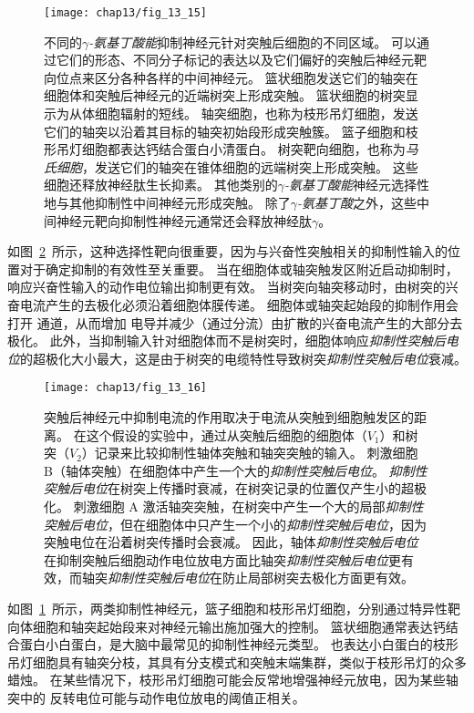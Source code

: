 \begin{figure}[htbp]
	\centering
	\texttt{[image: chap13/fig\_13\_15]}
	\caption{不同的\textit{$\gamma$-氨基丁酸能}抑制神经元针对突触后细胞的不同区域。
		可以通过它们的形态、不同分子标记的表达以及它们偏好的突触后神经元靶向位点来区分各种各样的中间神经元。
		篮状细胞发送它们的轴突在细胞体和突触后神经元的近端树突上形成突触。
		篮状细胞的树突显示为从体细胞辐射的短线。
		轴突细胞，也称为枝形吊灯细胞，发送它们的轴突以沿着其目标的轴突初始段形成突触簇。
		篮子细胞和枝形吊灯细胞都表达钙结合蛋白小清蛋白。
		树突靶向细胞，也称为\textit{马氏细胞}，发送它们的轴突在锥体细胞的远端树突上形成突触。
		这些细胞还释放神经肽生长抑素。
		其他类别的\textit{$\gamma$-氨基丁酸能}神经元选择性地与其他抑制性中间神经元形成突触。
		除了\textit{$\gamma$-氨基丁酸}之外，这些中间神经元靶向抑制性神经元通常还会释放神经肽$\gamma$。}
	\label{fig:13_15}
\end{figure}


如图~\ref{fig:13_16}~所示，这种选择性靶向很重要，因为与兴奋性突触相关的抑制性输入的位置对于确定抑制的有效性至关重要。
当在细胞体或轴突触发区附近启动抑制时，响应兴奋性输入的动作电位输出抑制更有效。
当树突向轴突移动时，由树突的兴奋电流产生的去极化必须沿着细胞体膜传递。
细胞体或轴突起始段的抑制作用会打开  通道，从而增加  电导并减少（通过分流）由扩散的兴奋电流产生的大部分去极化。
此外，当抑制输入针对细胞体而不是树突时，细胞体响应\textit{抑制性突触后电位}的超极化大小最大，这是由于树突的电缆特性导致树突\textit{抑制性突触后电位}衰减。


\begin{figure}[htbp]
	\centering
	\texttt{[image: chap13/fig\_13\_16]}
	\caption{突触后神经元中抑制电流的作用取决于电流从突触到细胞触发区的距离。
		在这个假设的实验中，通过从突触后细胞的细胞体（$ V_1 $）和树突（$ V_2 $）记录来比较抑制性轴体突触和轴突突触的输入。
		刺激细胞 B（轴体突触）在细胞体中产生一个大的\textit{抑制性突触后电位}。
		\textit{抑制性突触后电位}在树突上传播时衰减，在树突记录的位置仅产生小的超极化。
		刺激细胞 A 激活轴突突触，在树突中产生一个大的局部\textit{抑制性突触后电位}，但在细胞体中只产生一个小的\textit{抑制性突触后电位}，因为突触电位在沿着树突传播时会衰减。
		因此，轴体\textit{抑制性突触后电位}在抑制突触后细胞动作电位放电方面比轴突\textit{抑制性突触后电位}更有效，而轴突\textit{抑制性突触后电位}在防止局部树突去极化方面更有效。}
	\label{fig:13_16}
\end{figure}


如图~\ref{fig:13_15}~所示，两类抑制性神经元，篮子细胞和枝形吊灯细胞，分别通过特异性靶向体细胞和轴突起始段来对神经元输出施加强大的控制。
篮状细胞通常表达钙结合蛋白小白蛋白，是大脑中最常见的抑制性神经元类型。
也表达小白蛋白的枝形吊灯细胞具有轴突分枝，其具有分支模式和突触末端集群，类似于枝形吊灯的众多蜡烛。
在某些情况下，枝形吊灯细胞可能会反常地增强神经元放电，因为某些轴突中的  反转电位可能与动作电位放电的阈值正相关。


